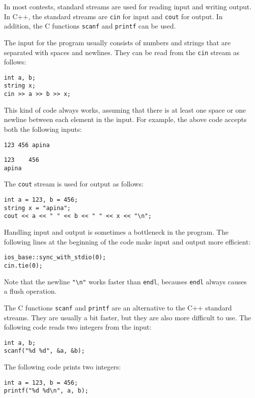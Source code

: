 
In most contests, standard streams are used for
reading input and writing output.
In C++, the standard streams are
\texttt{cin} for input and \texttt{cout} for output.
In addition, the C functions
\texttt{scanf} and \texttt{printf} can be used.

The input for the program usually consists of
numbers and strings that are separated with
spaces and newlines.
They can be read from the \texttt{cin} stream
as follows:

\begin{lstlisting}
int a, b;
string x;
cin >> a >> b >> x;
\end{lstlisting}

This kind of code always works,
assuming that there is at least one space
or one newline between each element in the input.
For example, the above code accepts
both the following inputs:
\begin{lstlisting}
123 456 apina
\end{lstlisting}
\begin{lstlisting}
123    456
apina
\end{lstlisting}
The \texttt{cout} stream is used for output
as follows:
\begin{lstlisting}
int a = 123, b = 456;
string x = "apina";
cout << a << " " << b << " " << x << "\n";
\end{lstlisting}

Handling input and output is sometimes
a bottleneck in the program.
The following lines at the beginning of the code
make input and output more efficient:

\begin{lstlisting}
ios_base::sync_with_stdio(0);
cin.tie(0);
\end{lstlisting}

Note that the newline \texttt{"\textbackslash n"}
works faster than \texttt{endl},
becauses \texttt{endl} always causes
a flush operation.

The C functions \texttt{scanf}
and \texttt{printf} are an alternative
to the C++ standard streams.
They are usually a bit faster,
but they are also more difficult to use.
The following code reads two integers from the input:
\begin{lstlisting}
int a, b;
scanf("%d %d", &a, &b);
\end{lstlisting}
The following code prints two integers:
\begin{lstlisting}
int a = 123, b = 456;
printf("%d %d\n", a, b);
\end{lstlisting}

